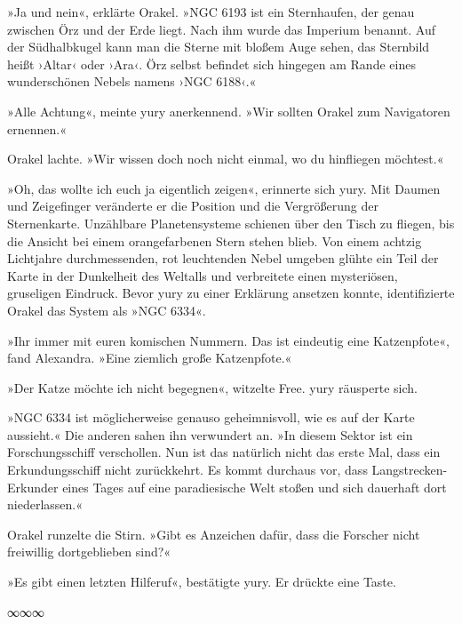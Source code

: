 »Ja und nein«, erklärte Orakel. »NGC 6193 ist ein Sternhaufen, der genau zwischen Örz und der Erde liegt. Nach ihm wurde das Imperium benannt. Auf der Südhalbkugel kann man die Sterne mit bloßem Auge sehen, das Sternbild heißt ›Altar‹ oder ›Ara‹. Örz selbst befindet sich hingegen am Rande eines wunderschönen Nebels namens ›NGC 6188‹.«

»Alle Achtung«, meinte yury anerkennend. »Wir sollten Orakel zum Navigatoren ernennen.«

Orakel lachte. »Wir wissen doch noch nicht einmal, wo du hinfliegen möchtest.«

»Oh, das wollte ich euch ja eigentlich zeigen«, erinnerte sich yury. Mit Daumen und Zeigefinger veränderte er die Position und die Vergrößerung der Sternenkarte. Unzählbare Planetensysteme schienen über den Tisch zu fliegen, bis die Ansicht bei einem orangefarbenen Stern stehen blieb. Von einem achtzig Lichtjahre durchmessenden, rot leuchtenden Nebel umgeben glühte ein Teil der Karte in der Dunkelheit des Weltalls und verbreitete einen mysteriösen, gruseligen Eindruck. Bevor yury zu einer Erklärung ansetzen konnte, identifizierte Orakel das System als »NGC 6334«.

\cleardoubleevenpage



»Ihr immer mit euren komischen Nummern. Das ist eindeutig eine Katzenpfote«, fand Alexandra. »Eine ziemlich große Katzenpfote.«

»Der Katze möchte ich nicht begegnen«, witzelte Free. yury räusperte sich.

»NGC 6334 ist möglicherweise genauso geheimnisvoll, wie es auf der Karte aussieht.« Die anderen sahen ihn verwundert an. »In diesem Sektor ist ein Forschungsschiff verschollen. Nun ist das natürlich nicht das erste Mal, dass ein Erkundungsschiff nicht zurückkehrt. Es kommt durchaus vor, dass Langstrecken-Erkunder eines Tages auf eine paradiesische Welt stoßen und sich dauerhaft dort niederlassen.«

Orakel runzelte die Stirn. »Gibt es Anzeichen dafür, dass die Forscher nicht freiwillig dortgeblieben sind?«

»Es gibt einen letzten Hilferuf«, bestätigte yury. Er drückte eine Taste.

\begin{center}
    ∞∞∞
\end{center}


